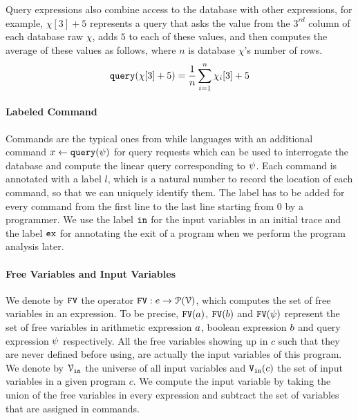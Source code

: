 Query expressions also combine access to the database with other expressions, 
for example, 
$\chi[3] + 5$ represents a query that asks the value from the $3^{rd}$ column of each database raw $\chi$, 
adds $5$ to each of these values, and then computes the average of these values as follows, where $n$ is 
database $\chi$'s number of rows.
%
\[
 {\tt query}(\chi[3] + 5) = \frac{1}{n}\sum\limits_{i = 1}^{n}\chi_i[3] + 5
 \]
\paragraph{Labeled Command}
Commands are the typical ones from while languages with an additional command $\mathrel{ x \leftarrow {\tt query}(\psi) }$ 
for query requests which can be used to interrogate the database and compute the linear query corresponding to $\psi$.
Each command is annotated with a label $l$, which is a natural number to record
the location of each command, so that we can uniquely identify them.
The label has to be added for every command from the first line to the last line starting from $0$ by a programmer.
We use the label $\mathtt{in}$ for the input variables in an initial trace
and the label $\mathtt{ex}$ for annotating the exit of a program when we perform the program analysis later.

\paragraph{Free Variables and Input Variables}
 We denote by $\mathtt{FV}$ the operator $\mathtt{FV}: e \to \mathcal{P}(\mathcal{V})$, which computes the set of free variables in an expression. To be precise,
 $\mathtt{FV}(a)$, $\mathtt{FV}(b)$ and $\mathtt{FV}(\psi)$ represent the set of free variables in arithmetic
 expression $a$, boolean expression $b$ and query expression $\psi$ respectively.
 All the free variables
 showing up in $c$ such that they are never defined before using, are actually the input variables of this program.
 We denote by $\mathcal{V}_{\mathtt{\mathtt{in}}}$ the universe of all input variables and $\mathtt{V_{\mathtt{in}}}(c)$ the set of input variables in a given program $c$.
 We compute the input variable by taking the union of the free variables in every expression
 and subtract the set of variables that are assigned in commands.
 
